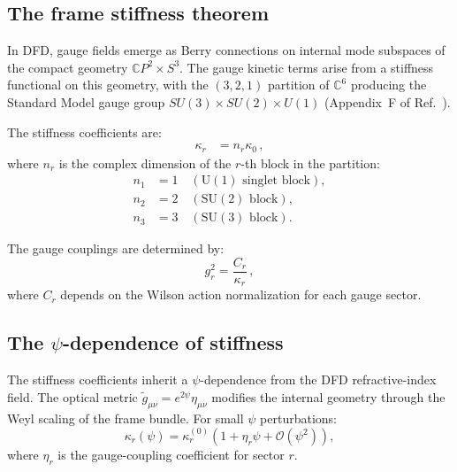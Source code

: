 \documentclass[aps,prd,twocolumn,superscriptaddress,floatfix,nofootinbib]{revtex4-2}
\newcommand{\kap}{\kappa}
\renewcommand{\order}[1]{\mathcal{O}\!\left(#1\right)}
\begin{document}
\subsection{The frame stiffness theorem}\label{sec:frame_stiffness}

In DFD, gauge fields emerge as Berry connections on internal mode subspaces
of the compact geometry $\mathbb{C}P^2 \times S^3$. The gauge kinetic terms
arise from a stiffness functional on this geometry, with the $(3,2,1)$
partition of $\mathbb{C}^6$ producing the Standard Model gauge group
$SU(3) \times SU(2) \times U(1)$ (Appendix~F of Ref.~\cite{DFD_Unified}).

The stiffness coefficients are:
\begin{align}
\kap_r &= n_r \kap_0 \, , \label{eq:kappa_r}
\end{align}
where $n_r$ is the complex dimension of the $r$-th block in the partition:
\begin{align}
n_1 &= 1 \quad (\text{U}(1) \text{ singlet block}), \\
n_2 &= 2 \quad (\text{SU}(2) \text{ block}), \\
n_3 &= 3 \quad (\text{SU}(3) \text{ block}).
\end{align}

The gauge couplings are determined by:
\begin{equation}
g_r^2 = \frac{C_r}{\kap_r} \, , \label{eq:g_from_kappa}
\end{equation}
where $C_r$ depends on the Wilson action normalization for each gauge sector.

\subsection{The $\psi$-dependence of stiffness}\label{sec:psi_dependence}

The stiffness coefficients inherit a $\psi$-dependence from the DFD
refractive-index field. The optical metric
$\tilde{g}_{\mu\nu} = e^{2\psi}\eta_{\mu\nu}$ modifies the internal
geometry through the Weyl scaling of the frame bundle. For small $\psi$
perturbations:
\begin{equation}
\kap_r(\psi) = \kap_r^{(0)} \left(1 + \eta_r \psi + \order{\psi^2}\right) ,
\label{eq:kappa_psi}
\end{equation}
where $\eta_r$ is the gauge-coupling coefficient for sector $r$.
\end{document}
